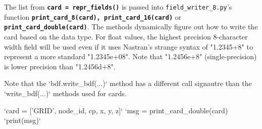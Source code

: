      The list from {\bf \tt card = repr_fields()} is passed into {\tt field_writer_8.py}'s function {\bf \tt print_card_8(card), print_card_16(card)} or {\bf \tt print_card_double(card)}.  The methods dynamically figure out how to write the card based on the data type.  For float values, the highest precision 8-character width field will be used even if it uses Nastran's strange syntax of "1.2345+8" to represent a more standard "1.2345e+08".  Note that "1.2456e+8" (single-precision) is lower precision than "1.2456d+8".

     Note that the `bdf.write_bdf(...)` method has a different call signautre than the `write_bdf(...)` methods used for cards.

     `card = ['GRID', node_id, cp, x, y, z]`
     `msg = print_card_double(card)
     `print(msg)`
